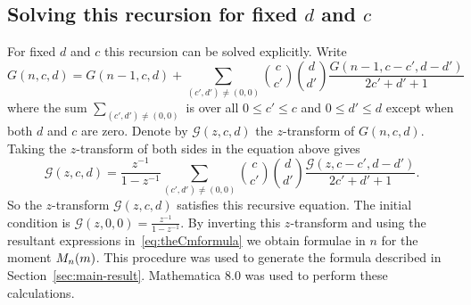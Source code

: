 \documentclass[journal, onecolumn, 11pt]{IEEEtran}
\begin{document}
\subsection{Solving this recursion for fixed $d$ and $c$}\label{sec:solv-this-recurs}
\newcommand{\calG}{\mathcal G}

For fixed $d$ and $c$ this recursion can be solved explicitly.  Write
\[
G(n,c,d) = G(n-1,c,d) + \sum_{ (c',d') \neq (0,0)} \binom{c}{c'}\binom{d}{d'} \frac{G(n-1,c-c',d-d')}{2c'+d'+1}
\]
where the sum $\sum_{ (c',d') \neq (0,0)}$ is over all $0 \leq c' \leq c$ and $0 \leq d' \leq d$ except when both $d$ and $c$ are zero.  Denote by $\calG(z,c,d)$ the $z$-transform of $G(n,c,d)$.  Taking the $z$-transform of both sides in the equation above gives
\[
\calG(z,c,d) = \frac{z^{-1}}{1-z^{-1}} \sum_{ (c',d') \neq (0,0)} \binom{c}{c'}\binom{d}{d'} \frac{\calG(z,c-c',d-d')}{2c'+d'+1}.
\]
So the $z$-transform $\calG(z,c,d)$ satisfies this recursive equation.  The initial condition is $\calG(z,0,0) = \frac{z^{-1}}{1 - z^{-1}}$.  By inverting this $z$-transform and using the resultant expressions in~\eqref{eq:theCmformula} we obtain formulae in $n$ for the moment $M_n(m)$.  This procedure was used to generate the formula described in Section~\ref{sec:main-result}.  Mathematica 8.0 was used to perform these calculations.

\small

\end{document}
